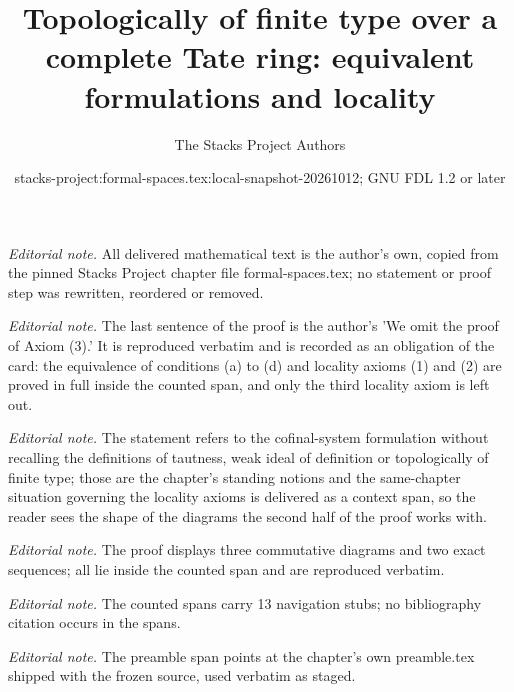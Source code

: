 \documentclass{stacks-project}
\title{Topologically of finite type over a complete Tate ring: equivalent formulations and locality}
\author{The Stacks Project Authors}
\date{stacks-project:formal-spaces.tex:local-snapshot-20261012; GNU FDL 1.2 or later}
\theoremstyle{plain}
\theoremstyle{definition}
\theoremstyle{remark}
\numberwithin{equation}{subsection}
\begin{document}
\maketitle
\noindent\textit{Editorial note.} All delivered mathematical text is the author's own, copied from the pinned Stacks Project chapter file formal-spaces.tex; no statement or proof step was rewritten, reordered or removed.\par\medskip
\noindent\textit{Editorial note.} The last sentence of the proof is the author's 'We omit the proof of Axiom (3).' It is reproduced verbatim and is recorded as an obligation of the card: the equivalence of conditions (a) to (d) and locality axioms (1) and (2) are proved in full inside the counted span, and only the third locality axiom is left out.\par\medskip
\noindent\textit{Editorial note.} The statement refers to the cofinal-system formulation without recalling the definitions of tautness, weak ideal of definition or topologically of finite type; those are the chapter's standing notions and the same-chapter situation governing the locality axioms is delivered as a context span, so the reader sees the shape of the diagrams the second half of the proof works with.\par\medskip
\noindent\textit{Editorial note.} The proof displays three commutative diagrams and two exact sequences; all lie inside the counted span and are reproduced verbatim.\par\medskip
\noindent\textit{Editorial note.} The counted spans carry 13 navigation stubs; no bibliography citation occurs in the spans.\par\medskip
\noindent\textit{Editorial note.} The preamble span points at the chapter's own preamble.tex shipped with the frozen source, used verbatim as staged.\par\medskip
\end{document}
